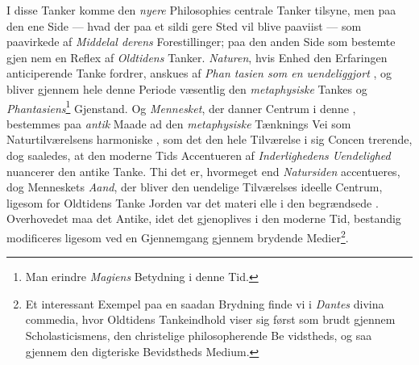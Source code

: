 I disse Tanker komme den \emph{nyere} Philosophies centrale
Tanker tilsyne, men paa den ene Side --- hvad der paa et sildi\-%
gere Sted vil blive paaviist --- som paavirkede af \emph{Middelal\-%
derens} Forestillinger; paa den anden Side som bestemte gjen\-%
nem en Reflex af \emph{Oldtidens} Tanker. \emph{Naturen}, hvis Enhed
den Erfaringen anticiperende Tanke fordrer, anskues af \emph{Phan\-%
tasien som en uendeliggjort} , og bliver gjennem
hele denne Periode væsentlig den \emph{metaphysiske} Tankes og
\emph{Phantasiens}\footnote{Man erindre \emph{Magiens} Betydning i denne Tid.} Gjenstand. Og \emph{Mennesket}, der danner
Centrum i denne , bestemmes paa \emph{antik} Maade ad
den \emph{metaphysiske} Tænknings Vei som Naturtilværelsens
harmoniske , som det den hele Tilværelse i sig Concen\-%
trerende, dog saaledes, at den moderne Tids Accentueren af
\emph{Inderlighedens Uendelighed} nuancerer den antike Tanke.
Thi det er, hvormeget end \emph{Natursiden} accentueres, dog
Menneskets \emph{Aand}, der bliver den uendelige Tilværelses ideelle
Centrum, ligesom for Oldtidens Tanke Jorden var det materi\-%
elle i den begrændsede . Overhovedet maa det Antike,
idet det gjenoplives i den moderne Tid, bestandig modificeres
ligesom ved en Gjennemgang gjennem brydende Medier\footnote{Et interessant Exempel paa en saadan Brydning finde vi i \emph{Dantes}
divina commedia, hvor Oldtidens Tankeindhold viser sig først som
brudt gjennem Scholasticismens, den christelige philosopherende Be\-%
vidstheds, og saa gjennem den digteriske Bevidstheds Medium.}.

